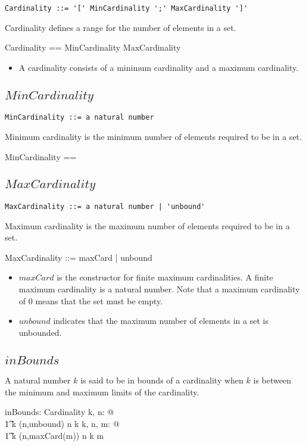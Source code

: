 \documentclass{article}
\begin{document}
\begin{verbatim}
Cardinality ::= '[' MinCardinality ';' MaxCardinality ']'
\end{verbatim}

Cardinality defines a range for the number of elements in a set.
\begin{zed}
	Cardinality == MinCardinality \cross MaxCardinality
\end{zed}
\begin{itemize}
\item A cardinality consists of a minimum cardinality and a maximum cardinality.
\end{itemize}

\subsection{$MinCardinality$}

\begin{verbatim}
MinCardinality ::= a natural number
\end{verbatim}

Minimum cardinality is the minimum number of elements required to be in a set.
\begin{zed}
	MinCardinality == \nat
\end{zed}

\subsection{$MaxCardinality$}

\begin{verbatim}
MaxCardinality ::= a natural number | 'unbound' 
\end{verbatim}

Maximum cardinality is the maximum number of elements required to be in a set.
\begin{zed}
	MaxCardinality ::= maxCard \ldata \nat \rdata | unbound
\end{zed}
\begin{itemize}
\item $maxCard$ is the constructor for finite maximum cardinalities.
A finite maximum cardinality is a natural number.
Note that a maximum cardinality of $0$ means that the set must be empty.
\item $unbound$ indicates that the maximum number of elements in a set is unbounded.
\end{itemize}

\subsection{$inBounds$}
A natural number $k$ is said to be in bounds of a cardinality when $k$ is between the minimum and maximum
limits of the cardinality.
\begin{axdef}
	inBounds: \nat \rel Cardinality
\where
	\forall k, n: \nat @ \\
\t1		k  (n,unbound) \iff n \leq k
\also
	\forall k, n, m: \nat @ \\
\t1		k  (n,maxCard(m)) \iff n \leq k \leq m
\end{axdef}
\end{document}
